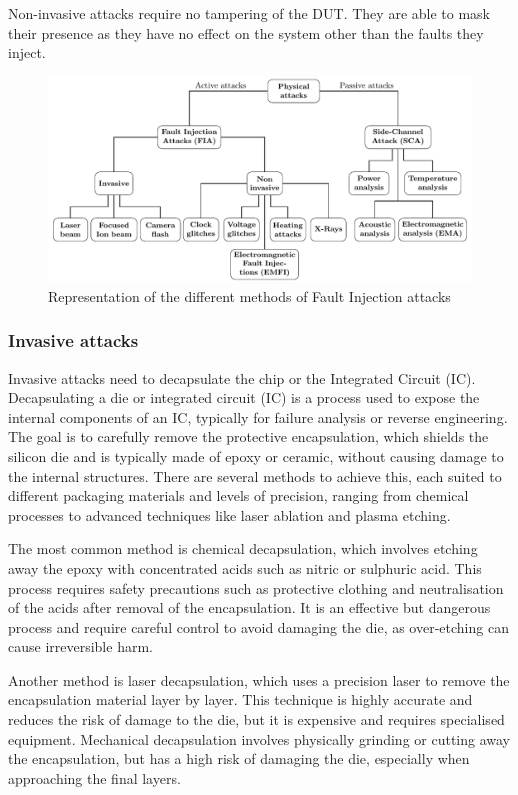 Non-invasive attacks require no tampering of the DUT. They are able to mask their presence as they have no effect on the system other than the faults they inject.

\begin{figure}[ht]
    \centering
    \includegraphics[page=2, width=.75\textwidth]{c2_soa/img/physicalAttacks.pdf}
    \caption{Representation of the different methods of Fault Injection attacks}
    \label{fig:fia}
\end{figure}

\subsubsection{Invasive attacks}
Invasive attacks need to decapsulate the chip or the Integrated Circuit (IC).
Decapsulating a die or integrated circuit (IC) is a process used to expose the internal components of an IC, typically for failure analysis or reverse engineering. The goal is to carefully remove the protective encapsulation, which shields the silicon die and is typically made of epoxy or ceramic, without causing damage to the internal structures. There are several methods to achieve this, each suited to different packaging materials and levels of precision, ranging from chemical processes to advanced techniques like laser ablation and plasma etching.

The most common method is chemical decapsulation, which involves etching away the epoxy with concentrated acids such as nitric or sulphuric acid. This process requires safety precautions such as protective clothing and neutralisation of the acids after removal of the encapsulation. It is an effective but dangerous process and require careful control to avoid damaging the die, as over-etching can cause irreversible harm.

Another method is laser decapsulation, which uses a precision laser to remove the encapsulation material layer by layer. This technique is highly accurate and reduces the risk of damage to the die, but it is expensive and requires specialised equipment. Mechanical decapsulation involves physically grinding or cutting away the encapsulation, but has a high risk of damaging the die, especially when approaching the final layers.

